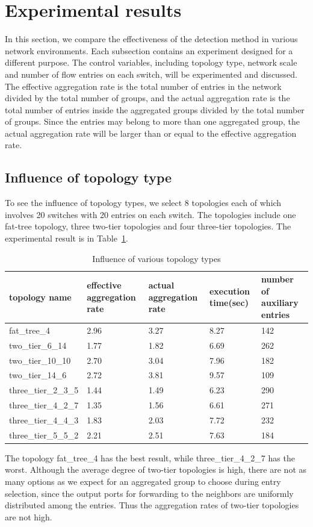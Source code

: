 \documentclass[conference]{IEEEtran}
\begin{document}
\section{Experimental results}
\label{sec:experiment}
In this section, we compare the effectiveness of the detection method in various network environments. Each subsection contains an experiment designed for a different purpose. The control variables, including topology type, network scale and number of flow entries on each switch, will be experimented and discussed. The effective aggregation rate is the total number of entries in the network divided by the total number of groups, and the actual aggregation rate is the total number of entries inside the aggregated groups divided by the total number of groups. Since the entries may belong to more than one aggregated group, the actual aggregation rate will be larger than or equal to the effective aggregation rate. 

\subsection{Influence of topology type}
To see the influence of topology types, we select 8 topologies each of which involves 20 switches with 20 entries on each switch. The topologies include one fat-tree topology, three two-tier topologies and four three-tier topologies. The experimental result is in Table~\ref{table:different_topo_type}. 

\begin{table}
\centering
\caption{Influence of various topology types}
\begin{tabular}{|p{1.8cm}|p{1.4cm}|p{1.3cm}|p{1.1cm}|p{1.3cm}|}
\hline topology name & effective aggregation rate & actual aggregation rate & execution time(sec) & number of auxiliary entries \\
\hline
\hline fat\_tree\_4 & 2.96 & 3.27 & 8.27 & 142 \\
\hline two\_tier\_6\_14 & 1.77 & 1.82 & 6.69 & 262 \\ 
\hline two\_tier\_10\_10 & 2.70 & 3.04 & 7.96 & 182 \\
\hline two\_tier\_14\_6 & 2.72 & 3.81 & 9.57 & 109 \\ 
\hline three\_tier\_2\_3\_5 & 1.44 & 1.49 & 6.23 & 290 \\
\hline three\_tier\_4\_2\_7 & 1.35 & 1.56 & 6.61 & 271 \\
\hline three\_tier\_4\_4\_3 & 1.83 & 2.03 & 7.72 & 232 \\
\hline three\_tier\_5\_5\_2 & 2.21 & 2.51 & 7.63 & 184 \\
\hline
\end{tabular}
\label{table:different_topo_type}
\end{table}
The topology fat\_tree\_4 has the best result, while three\_tier\_4\_2\_7 has the worst. Although the average degree of two-tier topologies is high, there are not as many options as we expect for an aggregated group to choose during entry selection, since the output ports for forwarding to the neighbors are uniformly distributed among the entries. Thus the aggregation rates of two-tier topologies are not high.
\end{document}
